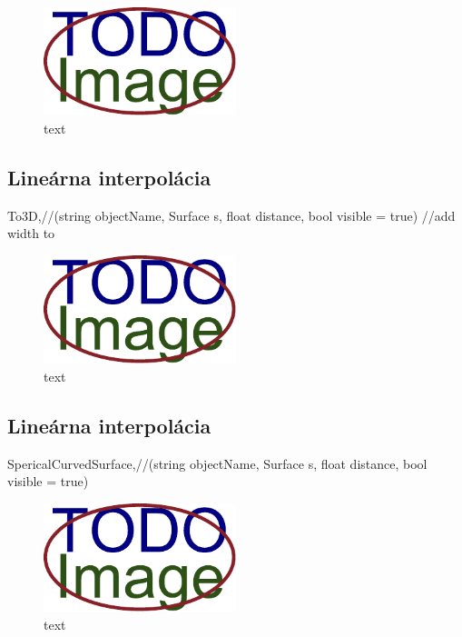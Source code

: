 \begin{figure}[H]
	\centering
	\includegraphics[width=0.5\textwidth]{obrazky-figures/placeholder.pdf}
	\caption{text}
	\label{fig:1}
\end{figure}


\subsection{Lineárna interpolácia}
To3D,//(string objectName, Surface s, float distance, bool visible = true) //add width to 

\begin{figure}[H]
	\centering
	\includegraphics[width=0.5\textwidth]{obrazky-figures/placeholder.pdf}
	\caption{text}
	\label{fig:1}
\end{figure}


\subsection{Lineárna interpolácia}
SpericalCurvedSurface,//(string objectName, Surface s, float distance, bool visible = true)

\begin{figure}[H]
	\centering
	\includegraphics[width=0.5\textwidth]{obrazky-figures/placeholder.pdf}
	\caption{text}
	\label{fig:1}
\end{figure}




